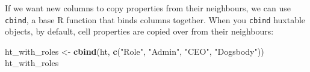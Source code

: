 \documentclass[]{article}
\newenvironment{Shaded}{\begin{snugshade}}{\end{snugshade}}
\newcommand{\KeywordTok}[1]{\textcolor[rgb]{0.13,0.29,0.53}{\textbf{#1}}}
\newcommand{\NormalTok}[1]{#1}
\newcommand{\StringTok}[1]{\textcolor[rgb]{0.31,0.60,0.02}{#1}}
\begin{document}
If we want new columns to copy properties from their neighbours, we can
use \texttt{cbind}, a base R function that binds columns together. When
you \texttt{cbind} huxtable objects, by default, cell properties are
copied over from their neighbours:

\begin{Shaded}
\begin{Highlighting}[]
\NormalTok{ht_with_roles <-}\StringTok{ }\KeywordTok{cbind}\NormalTok{(ht, }\KeywordTok{c}\NormalTok{(}\StringTok{"Role"}\NormalTok{, }\StringTok{"Admin"}\NormalTok{, }\StringTok{"CEO"}\NormalTok{, }\StringTok{"Dogsbody"}\NormalTok{))}
\NormalTok{ht_with_roles}
\end{Highlighting}
\end{Shaded}

 
  \providecommand{\huxb}[2]{\arrayrulecolor[RGB]{#1}\global\arrayrulewidth=#2pt}
  \providecommand{\huxvb}[2]{\color[RGB]{#1}\vrule width #2pt}
  \providecommand{\huxtpad}[1]{\rule{0pt}{\baselineskip+#1}}
  \providecommand{\huxbpad}[1]{\rule[-#1]{0pt}{#1}}
\end{document}

